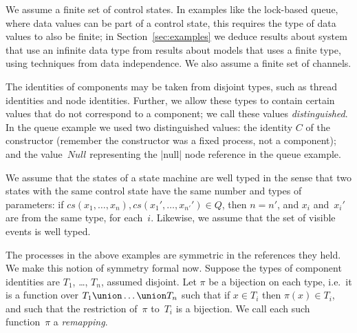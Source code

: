 

We assume a finite set of control states.  In examples like the lock-based
queue, where data values can be part of a control state, this requires the
type of data values to also be finite; in Section~\ref{sec:examples} we deduce
results about system that use an infinite data type from results about models
that uses a finite type, using techniques from data independence.  We also
assume a finite set of channels.

The identities of components may be taken from disjoint types, such as thread
identities and node identities.  Further, we allow these types to contain
certain values that do not correspond to a component; we call these
values \emph{distinguished}.  In the queue example we used two distinguished
values: the identity $C$ of the constructor (remember the constructor was a
fixed process, not a component); and the value~$Null$ representing the |null|
node reference in the queue example.

We assume that the states of a state machine are well typed in the sense that
two states with the same control state have the same number and types of
parameters: if $cs(x_1,\ldots,x_n), cs(x_1',\ldots,x_{n'}') \in Q$, then $n =
n'$, and $x_i$ and~$x_i'$ are from the same type, for each~$i$.  Likewise,
we assume that the set of visible events is well typed.

The processes in the above examples are symmetric in the references they held.
We make this notion of symmetry formal now.
%
Suppose the types of component identities are $T_1$, \ldots, $T_n$, assumed
disjoint.  Let $\pi$ be a bijection on each type, i.e.~it is a function over
$T_1 \union \ldots \union T_n$ such that if $x \in T_i$ then $\pi(x) \in T_i$,
and such that the restriction of~$\pi$ to~$T_i$ is a bijection.  We call each
such function~$\pi$ a \emph{remapping}.

